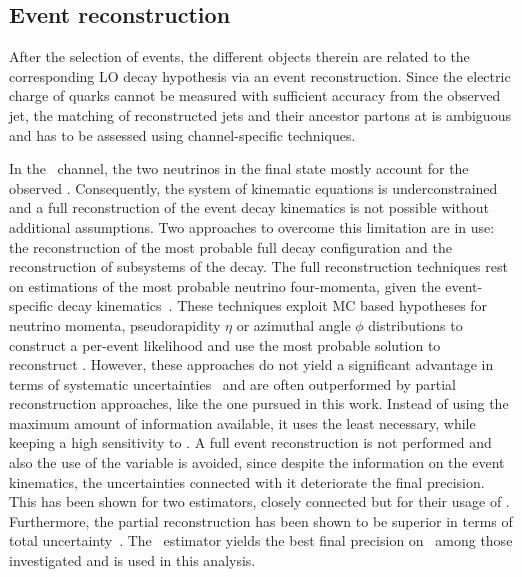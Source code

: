 \subsection{Event reconstruction}
\label{sect:dilreco7TeV}
After the selection of events, the different objects therein are related to the corresponding \gls{LO} decay hypothesis via an event reconstruction. 
%
Since the electric charge of quarks cannot be measured with sufficient accuracy from the observed jet, the matching of reconstructed jets and their ancestor partons at \genlevel is ambiguous and has to be assessed using channel-specific techniques.



In the \ttbarll\ channel, the two neutrinos in the final state mostly account for the observed \met. 
%
Consequently, the system of kinematic equations is underconstrained and a full reconstruction of the event decay kinematics is not possible without additional assumptions. 
%
Two approaches to overcome this limitation are in use: the reconstruction of the most probable full decay configuration and the reconstruction of subsystems of the decay.
%
The full reconstruction techniques rest on estimations of the most probable neutrino four-momenta, given the event-specific decay kinematics~\cite{PhysRevD.92.032003,CMS-PAS-TOP-14-010,D0:2015dxa}.
%
These techniques exploit \gls{MC} based hypotheses for neutrino momenta, pseudorapidity $\eta$ or azimuthal angle $\phi$ distributions to construct a per-event likelihood and use the most probable solution to reconstruct \mt. 
%
However, these approaches do not yield a significant advantage in terms of systematic uncertainties~\cite{Maier2012} and are often outperformed by partial reconstruction approaches, like the one pursued in this work. 
%
Instead of using the maximum amount of information available, it uses the least necessary, while keeping a high sensitivity to \mt. 
%
A full event reconstruction is not performed and also the use of the \met variable is avoided, since despite the information on the event kinematics, the uncertainties connected with it deteriorate the final precision. This has been shown for two estimators, closely connected but for their usage of \met. 
%
Furthermore, the partial reconstruction has been shown to be superior in terms of total uncertainty~\cite{Maier2012}.
%
The  \mlb\ estimator yields the best final precision on \mt\ among those investigated and is used in this analysis. 



